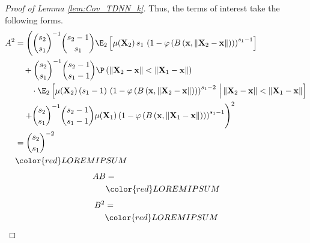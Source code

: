 \begin{proof}[Proof of Lemma \ref{lem:Cov_TDNN_k}]
	Thus, the terms of interest take the following forms.
	\begin{equation}
		\begin{aligned}
			A^2
			 & = \left(\binom{s_2}{s_1}^{-1}\binom{s_2 - 1}{s_1}
			 \E_{2}\left[\mu(\mathbf{X}_2) \, s_1 \, \left(1 - \varphi\left(B\left(\mathbf{x}, \| \mathbf{X}_2 - \mathbf{x} \|\right)\right)\right)^{s_1 - 1}\right] \right.                    \\ 
			  & \quad + \binom{s_2}{s_1}^{-1}\binom{s_2 - 1}{s_1 - 1}
			 \P\left(\|\mathbf{X}_2 - \mathbf{x}\| < \|\mathbf{X}_1 - \mathbf{x}\|\right)                                                                                                \\
			  &  \quad \quad \cdot
			 \E_{2}\left[\mu(\mathbf{X}_2) \, (s_1 - 1) \,
				 \left(1 - \varphi\left(B\left(\mathbf{x}, \| \mathbf{X}_2 - \mathbf{x} \|\right)\right)\right)^{s_1 - 2}
			 \, \Big| \, \|\mathbf{X}_2 - \mathbf{x}\| < \|\mathbf{X}_1 - \mathbf{x}\|\right]                                                                                            \\
			  & \quad \left. + \binom{s_2}{s_1}^{-1}\binom{s_2 - 1}{s_1 - 1}\mu(\mathbf{X}_1)
			 \left(1 - \varphi\left(B\left(\mathbf{x}, \| \mathbf{X}_1 - \mathbf{x} \|\right)\right)\right)^{s_1 - 1}         \right)^2               \\
			& = \binom{s_2}{s_1}^{-2}\\
			 & {\color{red} LOREM IPSUM}
		\end{aligned}
	\end{equation}
	\begin{equation}
		\begin{aligned}
			AB
			 & =                         \\
			 & {\color{red} LOREM IPSUM}
		\end{aligned}
	\end{equation}
	\begin{equation}
		\begin{aligned}
			B^2
			 & =                         \\
			 & {\color{red} LOREM IPSUM}
		\end{aligned}
	\end{equation}


\end{proof}
